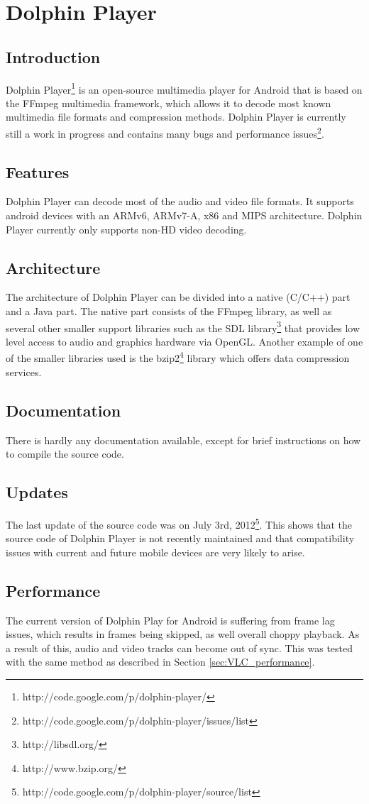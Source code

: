\section{Dolphin Player}
\subsection{Introduction}
Dolphin Player\footnote{http://code.google.com/p/dolphin-player/} is an open-source multimedia player for Android that is based on the FFmpeg multimedia framework, which allows it to decode most known multimedia file formats and compression methods. Dolphin Player is currently still a work in progress and contains many bugs and performance issues\footnote{http://code.google.com/p/dolphin-player/issues/list}.
\subsection{Features}
Dolphin Player can decode most of the audio and video file formats. It supports android devices with an ARMv6, ARMv7-A, x86 and MIPS architecture. Dolphin Player currently only supports non-HD video decoding.
\subsection{Architecture}
The architecture of Dolphin Player can be divided into a native (C/C++) part and a Java part. The native part consists of the FFmpeg library, as well as several other smaller support libraries such as the SDL library\footnote{http://libsdl.org/} that provides low level access to audio and graphics hardware via OpenGL. Another example of one of the smaller libraries used is the bzip2\footnote{http://www.bzip.org/} library which offers data compression services.
\subsection{Documentation}
There is hardly any documentation available, except for brief instructions on how to compile the source code.
\subsection{Updates}
The last update of the source code was on July 3rd, 2012\footnote{http://code.google.com/p/dolphin-player/source/list}. This shows that the source code of Dolphin Player is not recently maintained and that compatibility issues with current and future mobile devices are very likely to arise.
\subsection{Performance}
The current version of Dolphin Play for Android is suffering from frame lag issues, which results in frames being skipped, as well overall choppy playback. As a result of this, audio and video tracks can become out of sync. This was tested with the same method as described in Section \ref{sec:VLC_performance}.


